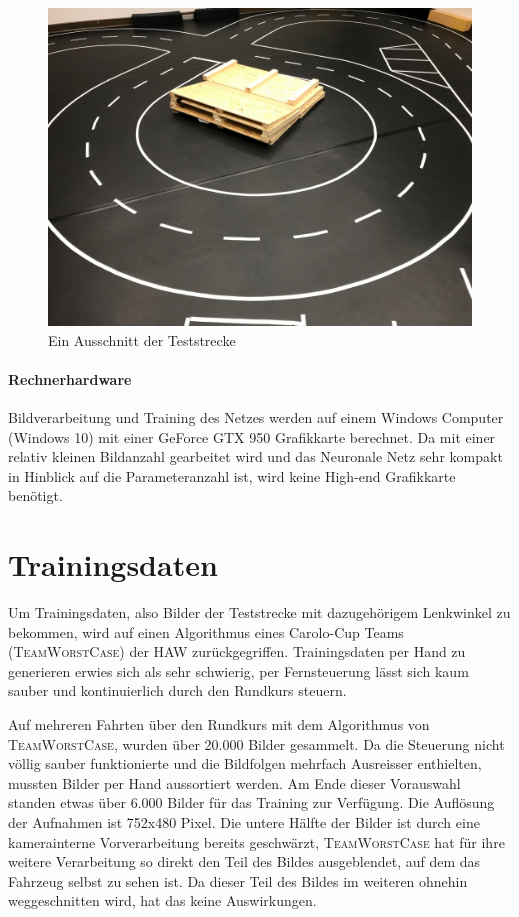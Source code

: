 \begin{figure}[h]
	\centering
	\includegraphics[scale=0.15]{figures/Teststrecke-Ausschnitt.jpg}
	\caption{Ein Ausschnitt der Teststrecke}
	\label{img:teststrecke}
\end{figure}
\paragraph{Rechnerhardware}
Bildverarbeitung und Training des Netzes werden auf einem Windows Computer (Windows 10) mit einer GeForce GTX 950 Grafikkarte berechnet. Da mit einer relativ kleinen Bildanzahl gearbeitet wird und das Neuronale Netz sehr kompakt in Hinblick auf die Parameteranzahl ist, wird keine High-end Grafikkarte benötigt.


\section{Trainingsdaten}

Um Trainingsdaten, also Bilder der Teststrecke mit dazugehörigem Lenkwinkel zu bekommen, wird auf einen Algorithmus eines Carolo-Cup Teams (\textsc{TeamWorstCase}) der HAW zurückgegriffen. Trainingsdaten per Hand zu generieren erwies sich als sehr schwierig, per Fernsteuerung lässt sich kaum sauber und kontinuierlich durch den Rundkurs steuern.

Auf mehreren Fahrten über den Rundkurs mit dem Algorithmus von \textsc{TeamWorstCase}, wurden über 20.000 Bilder gesammelt. Da die Steuerung nicht völlig sauber funktionierte und die Bildfolgen mehrfach Ausreisser enthielten, mussten Bilder per Hand aussortiert werden. Am Ende dieser Vorauswahl standen etwas über 6.000 Bilder für das Training zur Verfügung. Die Auflösung der Aufnahmen ist 752x480 Pixel. Die untere Hälfte der Bilder ist durch eine kamerainterne Vorverarbeitung bereits geschwärzt, \textsc{TeamWorstCase} hat für ihre weitere Verarbeitung so direkt den Teil des Bildes ausgeblendet, auf dem das Fahrzeug selbst zu sehen ist. Da dieser Teil des Bildes im weiteren ohnehin weggeschnitten wird, hat das keine Auswirkungen. 

